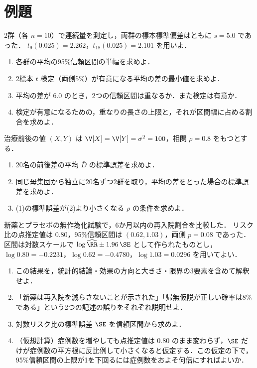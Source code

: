 \section{例題}\label{sec:01-ex}
\begin{reidai}[信頼区間の重なり]\label{reidai:01-1}
2群（各 $n=10$）で連続量を測定し，両群の標本標準偏差はともに $s=5.0$ であった．
$t_9(0.025)=2.262$，$t_{18}(0.025)=2.101$ を用いよ．
\begin{enumerate}[label=(\arabic*)]
\item 各群の平均の95\%信頼区間の半幅を求めよ．
\item 2標本 $t$ 検定（両側5\%）が有意になる平均の差の最小値を求めよ．
\item 平均の差が $6.0$ のとき，2つの信頼区間は重なるか．また検定は有意か．
\item 検定が有意になるための，重なりの長さの上限と，それが区間幅に占める割合を求めよ．
\end{enumerate}
\end{reidai}

\begin{reidai}[対応の利用]\label{reidai:01-2}
治療前後の値 $(X,Y)$ は
$\V[X]=\V[Y]=\sigma^2=100$，相関 $\rho=0.8$ をもつとする．
\begin{enumerate}[label=(\arabic*)]
\item 20名の前後差の平均 $\bar D$ の標準誤差を求めよ．
\item 同じ母集団から独立に20名ずつ2群を取り，平均の差をとった場合の標準誤差を求めよ．
\item (1)の標準誤差が(2)より小さくなる $\rho$ の条件を求めよ．
\end{enumerate}
\end{reidai}

\begin{reidai}[解釈]\label{reidai:01-3}
新薬とプラセボの無作為化試験で，6か月以内の再入院割合を比較した．
リスク比の点推定値は $0.80$，95\%信頼区間は $(0.62,1.03)$，両側 $p=0.08$ であった．
区間は対数スケールで $\log\widehat{\RR}\pm1.96\,\SE$ として作られたものとし，
$\log0.80=-0.2231$，$\log0.62=-0.4780$，$\log1.03=0.0296$ を用いてよい．
\begin{enumerate}[label=(\arabic*)]
\item この結果を，統計的結論・効果の方向と大きさ・限界の3要素を含めて解釈せよ．
\item 「新薬は再入院を減らさないことが示された」「帰無仮説が正しい確率は8\%である」という2つの記述の誤りをそれぞれ説明せよ．
\item 対数リスク比の標準誤差 $\SE$ を信頼区間から求めよ．
\item （仮想計算）症例数を増やしても点推定値は $0.80$ のまま変わらず，$\SE$ だけが症例数の平方根に反比例して小さくなると仮定する．この仮定の下で，95\%信頼区間の上限が1を下回るには症例数をおよそ何倍にすればよいか．
\end{enumerate}
\end{reidai}

